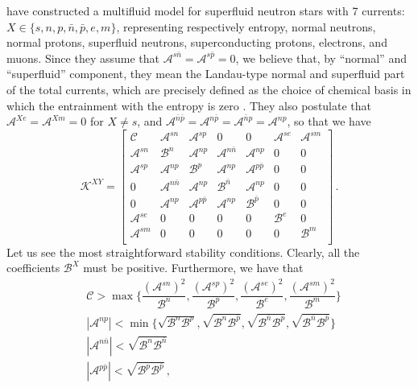\documentclass[a4paper, amsfonts, amssymb, amsmath, reprint, showkeys, nofootinbib, twoside, onecolumn,notitlepage]{revtex4-1}
\theoremstyle{definition}
\theoremstyle{theorem}
\begin{document}
\citet{RauWasserman2020} have constructed a multifluid model for superfluid neutron stars with 7 currents: $X \in \{s, n,p,\bar{n},\bar{p}, e,m \}$, representing respectively entropy, normal neutrons, normal protons, superfluid neutrons, superconducting protons, electrons, and muons. Since they assume that $\mathcal{A}^{s\bar{n}}=\mathcal{A}^{s\bar{p}}=0$, we believe that, by ``normal'' and ``superfluid'' component, they mean the Landau-type normal and superfluid part of the total currents, which are precisely defined as the choice of chemical basis in which the entrainment with the entropy is zero \cite{carter92}. They also postulate that $\mathcal{A}^{Xe}=\mathcal{A}^{Xm}=0$ for $X \neq s$, and $\mathcal{A}^{\bar{n}\bar{p}}=\mathcal{A}^{n\bar{p}}=\mathcal{A}^{\bar{n} p}=\mathcal{A}^{np}$, so that we have
\begin{equation}
\mathcal{K}^{XY}=
\begin{bmatrix}
\mathcal{C} & \mathcal{A}^{sn} & \mathcal{A}^{sp} & 0 & 0 & \mathcal{A}^{se} & \mathcal{A}^{sm}  \\
\mathcal{A}^{sn} & \mathcal{B}^n & \mathcal{A}^{np} & \mathcal{A}^{n\bar{n}} & \mathcal{A}^{np} & 0 & 0  \\
\mathcal{A}^{sp} & \mathcal{A}^{np} & \mathcal{B}^p & \mathcal{A}^{np} & \mathcal{A}^{p\bar{p}} & 0 & 0  \\
0 & \mathcal{A}^{n\bar{n}} & \mathcal{A}^{np} & \mathcal{B}^{\bar{n}} & \mathcal{A}^{np} & 0 & 0  \\
0 & \mathcal{A}^{np} & \mathcal{A}^{p\bar{p}} & \mathcal{A}^{np} & \mathcal{B}^{\bar{p}} & 0 & 0  \\
\mathcal{A}^{se} & 0 & 0 & 0 & 0 & \mathcal{B}^e & 0  \\
\mathcal{A}^{sm} & 0 & 0 & 0 & 0 & 0 & \mathcal{B}^m  \\
\end{bmatrix} \, .
\end{equation}
Let us see the most straightforward stability conditions. Clearly, all the coefficients $\mathcal{B}^X$ must be positive. Furthermore, we have that
\begin{equation}
\begin{split}
& \mathcal{C}> \max \bigg\{ \dfrac{(\mathcal{A}^{sn})^2}{\mathcal{B}^n} , \dfrac{(\mathcal{A}^{sp})^2}{\mathcal{B}^p}, \dfrac{(\mathcal{A}^{se})^2}{\mathcal{B}^e}, \dfrac{(\mathcal{A}^{sm})^2}{\mathcal{B}^m}  \bigg\}\\
& |\mathcal{A}^{np}| < \min \{ \sqrt{\mathcal{B}^n \mathcal{B}^p} , \sqrt{\mathcal{B}^n \mathcal{B}^{\bar{p}}}, \sqrt{\mathcal{B}^{\bar{n}} \mathcal{B}^p} , \sqrt{\mathcal{B}^{\bar{n}} \mathcal{B}^{\bar{p}}} \} \\
& |\mathcal{A}^{n\bar{n}}| < \sqrt{\mathcal{B}^n \mathcal{B}^{\bar{n}}} \\
& |\mathcal{A}^{p\bar{p}}| < \sqrt{\mathcal{B}^p \mathcal{B}^{\bar{p}}} \, , \\
\end{split}
\end{equation}
\end{document}
